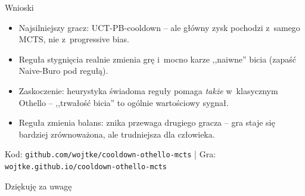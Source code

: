 \documentclass[aspectratio=169]{beamer}
\begin{document}
\begin{frame}{Wnioski}
\begin{itemize}
  \item Najsilniejszy gracz: UCT-PB-cooldown -- ale główny zysk pochodzi z~samego MCTS,
        nie z~progressive bias.
  \item Reguła stygnięcia realnie zmienia grę i~mocno karze ,,naiwne'' bicia
        (zapaść Naive-Buro pod regułą).
  \item Zaskoczenie: heurystyka świadoma reguły pomaga \emph{także} w~klasycznym Othello --
        ,,trwałość bicia'' to ogólnie wartościowy sygnał.
  \item Reguła zmienia balans: znika przewaga drugiego gracza -- gra staje się bardziej
        zrównoważona, ale trudniejsza dla człowieka.
\end{itemize}
\vspace{6pt}
\centering\small Kod: \texttt{github.com/wojtke/cooldown-othello-mcts} \quad|\quad
Gra: \texttt{wojtke.github.io/cooldown-othello-mcts}
\end{frame}

\begin{frame}\centering\Large Dziękuję za uwagę\end{frame}
\end{document}
